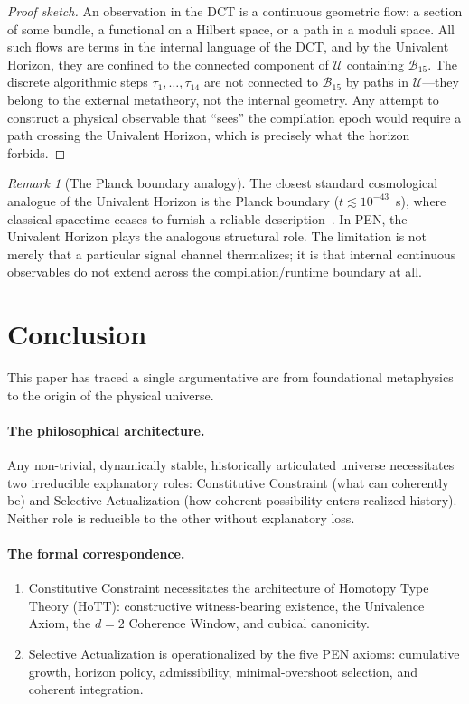 \documentclass[11pt,a4paper]{article}
\theoremstyle{plain}
\theoremstyle{definition}
\theoremstyle{remark}
\newtheorem{remark}[theorem]{Remark}
\newcommand{\U}{\mathcal{U}}
\newcommand{\B}{\mathcal{B}}
\begin{document}
\begin{proof}[Proof sketch]
An observation in the DCT is a continuous geometric flow: a section of some bundle, a functional on a Hilbert space, or a path in a moduli space.  All such flows are terms in the internal language of the DCT, and by the Univalent Horizon, they are confined to the connected component of $\U$ containing $\B_{15}$.  The discrete algorithmic steps $\tau_1, \ldots, \tau_{14}$ are not connected to $\B_{15}$ by paths in $\U$---they belong to the external metatheory, not the internal geometry.  Any attempt to construct a physical observable that ``sees'' the compilation epoch would require a path crossing the Univalent Horizon, which is precisely what the horizon forbids.
\end{proof}

\begin{remark}[The Planck boundary analogy]
The closest standard cosmological analogue of the Univalent Horizon is the Planck boundary ($t \lesssim 10^{-43}$~s), where classical spacetime ceases to furnish a reliable description~\cite{mukhanov2005}.  In PEN, the Univalent Horizon plays the analogous structural role.  The limitation is not merely that a particular signal channel thermalizes; it is that internal continuous observables do not extend across the compilation/runtime boundary at all.
\end{remark}


\section{Conclusion}
\label{sec:conclusion}

This paper has traced a single argumentative arc from foundational metaphysics to the origin of the physical universe.

\paragraph{The philosophical architecture.}  Any non-trivial, dynamically stable, historically articulated universe necessitates two irreducible explanatory roles: Constitutive Constraint (what can coherently be) and Selective Actualization (how coherent possibility enters realized history).  Neither role is reducible to the other without explanatory loss.

\paragraph{The formal correspondence.}
\begin{enumerate}[nosep]
    \item Constitutive Constraint necessitates the architecture of Homotopy Type Theory (HoTT): constructive witness-bearing existence, the Univalence Axiom, the $d = 2$ Coherence Window, and cubical canonicity.
    \item Selective Actualization is operationalized by the five PEN axioms: cumulative growth, horizon policy, admissibility, minimal-overshoot selection, and coherent integration.
\end{enumerate}
\end{document}
